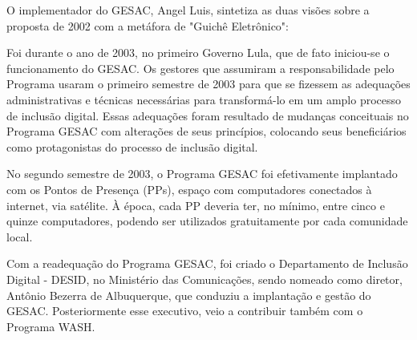 O implementador do GESAC, Angel Luis, sintetiza as duas visões sobre a proposta de 2002 com a metáfora de "Guichê Eletrônico":


\noindent\begin{flushright}\mbox{\linespread{1}\selectfont\centering{}}\end{flushright}


Foi durante o ano de 2003, no primeiro Governo Lula, que de fato iniciou-se o funcionamento do  GESAC. Os gestores que assumiram a responsabilidade pelo Programa usaram o primeiro semestre de 2003 para que se fizessem as adequações administrativas e técnicas necessárias para transformá-lo em um amplo processo de inclusão digital. Essas adequações foram resultado de mudanças conceituais no Programa GESAC com alterações de seus princípios, colocando seus beneficiários como protagonistas do processo de inclusão digital.

No segundo semestre de 2003, o Programa GESAC foi efetivamente implantado com os Pontos de Presença (PPs), espaço com  computadores conectados à internet, via satélite. À época, cada PP deveria ter, no mínimo, entre cinco e quinze computadores, podendo ser utilizados gratuitamente por cada comunidade local.

Com a readequação do Programa GESAC, foi criado o Departamento de Inclusão Digital - DESID, no Ministério das Comunicações, sendo nomeado como diretor, Antônio Bezerra de Albuquerque, que conduziu a implantação e gestão do GESAC. Posteriormente esse executivo, veio a contribuir também com o Programa WASH.


\noindent\begin{flushright}\mbox{\linespread{1}\selectfont\centering{}}\end{flushright}


